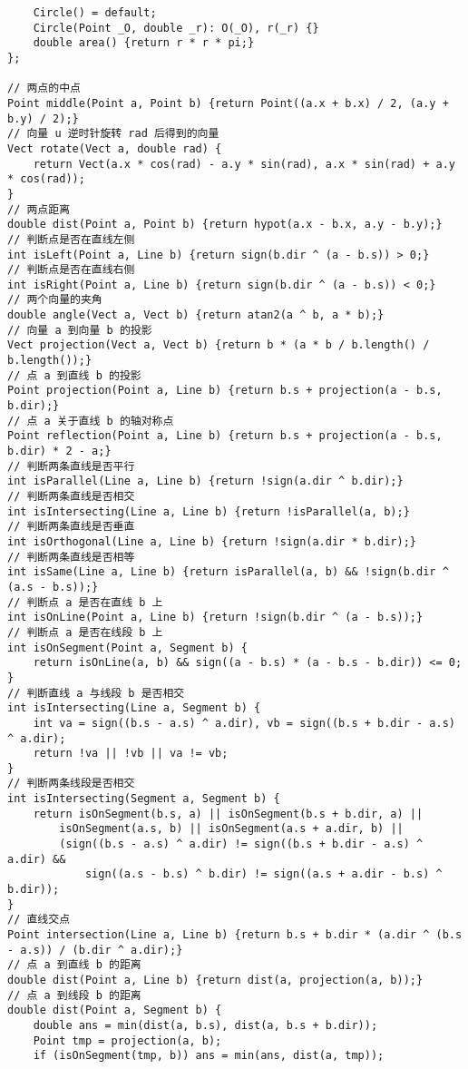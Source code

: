\begin{verbatim}
    Circle() = default;
    Circle(Point _O, double _r): O(_O), r(_r) {}
    double area() {return r * r * pi;}
};

// 两点的中点
Point middle(Point a, Point b) {return Point((a.x + b.x) / 2, (a.y + b.y) / 2);}
// 向量 u 逆时针旋转 rad 后得到的向量
Vect rotate(Vect a, double rad) {
    return Vect(a.x * cos(rad) - a.y * sin(rad), a.x * sin(rad) + a.y * cos(rad));
}
// 两点距离
double dist(Point a, Point b) {return hypot(a.x - b.x, a.y - b.y);}
// 判断点是否在直线左侧
int isLeft(Point a, Line b) {return sign(b.dir ^ (a - b.s)) > 0;}
// 判断点是否在直线右侧
int isRight(Point a, Line b) {return sign(b.dir ^ (a - b.s)) < 0;}
// 两个向量的夹角
double angle(Vect a, Vect b) {return atan2(a ^ b, a * b);}
// 向量 a 到向量 b 的投影
Vect projection(Vect a, Vect b) {return b * (a * b / b.length() / b.length());}
// 点 a 到直线 b 的投影
Point projection(Point a, Line b) {return b.s + projection(a - b.s, b.dir);}
// 点 a 关于直线 b 的轴对称点
Point reflection(Point a, Line b) {return b.s + projection(a - b.s, b.dir) * 2 - a;}
// 判断两条直线是否平行
int isParallel(Line a, Line b) {return !sign(a.dir ^ b.dir);}
// 判断两条直线是否相交
int isIntersecting(Line a, Line b) {return !isParallel(a, b);}
// 判断两条直线是否垂直
int isOrthogonal(Line a, Line b) {return !sign(a.dir * b.dir);}
// 判断两条直线是否相等
int isSame(Line a, Line b) {return isParallel(a, b) && !sign(b.dir ^ (a.s - b.s));}
// 判断点 a 是否在直线 b 上
int isOnLine(Point a, Line b) {return !sign(b.dir ^ (a - b.s));}
// 判断点 a 是否在线段 b 上
int isOnSegment(Point a, Segment b) {
    return isOnLine(a, b) && sign((a - b.s) * (a - b.s - b.dir)) <= 0;
}
// 判断直线 a 与线段 b 是否相交
int isIntersecting(Line a, Segment b) {
    int va = sign((b.s - a.s) ^ a.dir), vb = sign((b.s + b.dir - a.s) ^ a.dir);
    return !va || !vb || va != vb;
}
// 判断两条线段是否相交
int isIntersecting(Segment a, Segment b) {
    return isOnSegment(b.s, a) || isOnSegment(b.s + b.dir, a) ||
        isOnSegment(a.s, b) || isOnSegment(a.s + a.dir, b) ||
        (sign((b.s - a.s) ^ a.dir) != sign((b.s + b.dir - a.s) ^ a.dir) &&
            sign((a.s - b.s) ^ b.dir) != sign((a.s + a.dir - b.s) ^ b.dir));
}
// 直线交点
Point intersection(Line a, Line b) {return b.s + b.dir * (a.dir ^ (b.s - a.s)) / (b.dir ^ a.dir);}
// 点 a 到直线 b 的距离
double dist(Point a, Line b) {return dist(a, projection(a, b));}
// 点 a 到线段 b 的距离
double dist(Point a, Segment b) {
    double ans = min(dist(a, b.s), dist(a, b.s + b.dir));
    Point tmp = projection(a, b);
    if (isOnSegment(tmp, b)) ans = min(ans, dist(a, tmp));

\end{verbatim}
